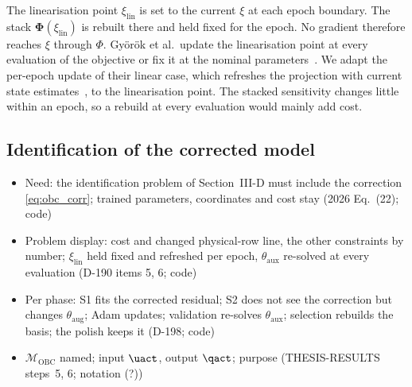 The linearisation point $\xi_{\mathrm{lin}}$ is set to the current $\xi$ at
each epoch boundary.
The stack $\boldsymbol\Phi(\xi_{\mathrm{lin}})$ is rebuilt there and held
fixed for the epoch.
No gradient therefore reaches $\xi$ through $\Phi$.
Gy\"or\"ok et al.\ update the linearisation point at every evaluation of the
objective or fix it at the nominal parameters~\cite[Sec.~4]{gyorok2025l4dc}.
We adapt the per-epoch update of their linear case, which refreshes the
projection with current state estimates~\cite[Remark~2]{gyorok2025l4dc}, to
the linearisation point.
The stacked sensitivity changes little within an epoch, so a rebuild at every
evaluation would mainly add cost.

\subsection{Identification of the corrected model}\label{sec:obc_ident}
\ifdraft
\begin{itemize}
\item Need: the identification problem of Section~III-D must include the correction \eqref{eq:obc_corr}; trained parameters, coordinates and cost stay (2026 Eq.~(22); code)
\item Problem display: cost and changed physical-row line, the other constraints by number; $\xi_{\mathrm{lin}}$ held fixed and refreshed per epoch, $\theta_{\mathrm{aux}}$ re-solved at every evaluation (D-190 items 5, 6; code)
\item Per phase: S1 fits the corrected residual; S2 does not see the correction but changes $\theta_{\mathrm{aug}}$; Adam updates; validation re-solves $\theta_{\mathrm{aux}}$; selection rebuilds the basis; the polish keeps it (D-198; code)
\item $\mathcal M_{\mathrm{OBC}}$ named; input $\uact$, output $\qact$; purpose (THESIS-RESULTS steps~5, 6; notation (?))
\end{itemize}
\fi


